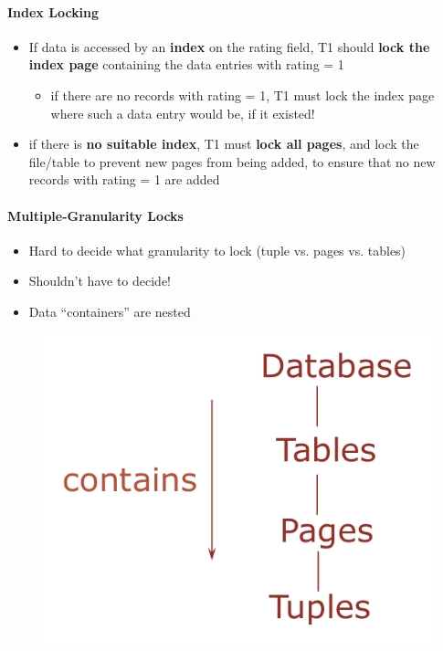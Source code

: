 \paragraph{Index Locking}
\begin{itemize}
\item If data is accessed by an \textbf{index} on the rating field,
  T1 should \textbf{lock the index page} containing the data entries
  with rating = 1
  \begin{itemize}
  \item if there are no records with rating = 1, T1 must lock the
    index page where such a data entry would be, if it existed!
  \end{itemize}

\item if there is \textbf{no suitable index}, T1 must
  \textbf{lock all pages}, and lock the file/table to prevent new
  pages from being added, to ensure that no new records
  with rating = 1 are added
\end{itemize}

\paragraph{Multiple-Granularity Locks}
\begin{itemize}
\item Hard to decide what granularity to lock
  (tuple vs. pages vs. tables)
\item Shouldn't have to decide!
\item Data ``containers'' are nested
\end{itemize}
\begin{figure}[h]
  \begin{minipage}{1.0\linewidth}
    \begin{center}
      \includegraphics[scale=0.15]{graphics/DB_granularity.png}
    \end{center}
  \end{minipage}
\end{figure}


